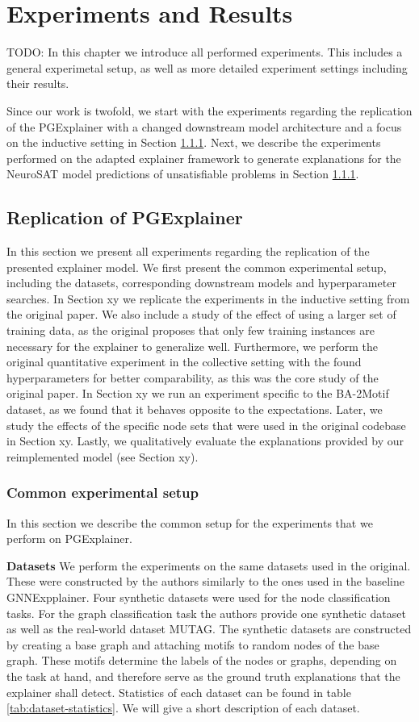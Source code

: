 \chapter{Experiments and Results}
\label{ch:Experiments}

TODO: In this chapter we introduce all performed experiments. This includes a general experimetal setup, as well as more detailed experiment settings including their results.

Since our work is twofold, we start with the experiments regarding the replication of the PGExplainer with a changed downstream model architecture and a focus on the inductive setting in Section \ref{}. Next, we describe the experiments performed on the adapted explainer framework to generate explanations for the NeuroSAT model predictions of unsatisfiable problems in Section \ref{}.

\section{Replication of PGExplainer}
In this section we present all experiments regarding the replication of the presented explainer model. We first present the common experimental setup, including the datasets, corresponding downstream models and hyperparameter searches. In Section xy we replicate the experiments in the inductive setting from the original paper. We also include a study of the effect of using a larger set of training data, as the original proposes that only few training instances are necessary for the explainer to generalize well. Furthermore, we perform the original quantitative experiment in the collective setting with the found hyperparameters for better comparability, as this was the core study of the original paper. In Section xy we run an experiment specific to the BA-2Motif dataset, as we found that it behaves opposite to the expectations. Later, we study the effects of the specific node sets that were used in the original codebase in Section xy. Lastly, we qualitatively evaluate the explanations provided by our reimplemented model (see Section xy).

\subsection{Common experimental setup}
In this section we describe the common setup for the experiments that we perform on PGExplainer.

\textbf{Datasets}
We perform the experiments on the same datasets used in the original. These were constructed by the authors similarly to the ones used in the baseline GNNExpplainer. Four synthetic datasets were used for the node classification tasks. For the graph classification task the authors provide one synthetic dataset as well as the real-world dataset MUTAG. The synthetic datasets are constructed by creating a base graph and attaching motifs to random nodes of the base graph. These motifs determine the labels of the nodes or graphs, depending on the task at hand, and therefore serve as the ground truth explanations that the explainer shall detect. Statistics of each dataset can be found in table \ref{tab:dataset-statistics}. We will give a short description of each dataset.

